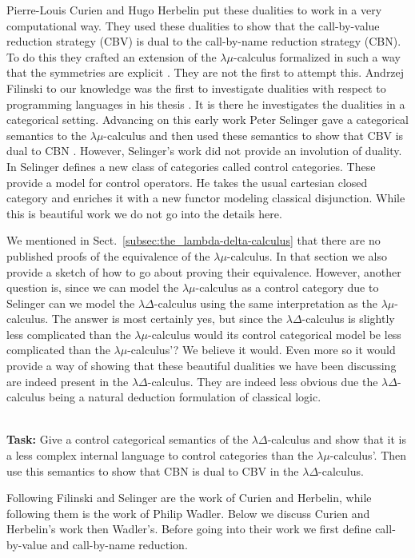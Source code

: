 Pierre-Louis Curien and Hugo Herbelin put these dualities to work in a
very computational way.  They used these dualities to show that the
call-by-value reduction strategy (CBV) is dual to the call-by-name
reduction strategy (CBN).  To do this they crafted an extension of the
$\lambda\mu$-calculus formalized in such a way that the symmetries are
explicit \cite{Curien:2000}.  They are not the first to attempt this.
Andrzej Filinski to our knowledge was the first to investigate
dualities with respect to programming languages in his thesis
\cite{Filinski:1989}.  It is there he investigates the dualities in a
categorical setting.  Advancing on this early work Peter Selinger gave
a categorical semantics to the $\lambda\mu$-calculus and then used
these semantics to show that CBV is dual to CBN \cite{Selinger:2001}.
However, Selinger's work did not provide an involution of duality.  In
\cite{Selinger:2001} Selinger defines a new class of categories called
control categories.  These provide a model for control operators.  He
takes the usual cartesian closed category and enriches it with a new
functor modeling classical disjunction.  While this is beautiful work
we do not go into the details here.  

\begin{openproblem}
  We mentioned in Sect.~\ref{subsec:the_lambda-delta-calculus} that
  there are no published proofs of the equivalence of the
  $\lambda\mu$-calculus.  In that section we also provide a sketch of
  how to go about proving their equivalence.  However, another
  question is, since we can model the $\lambda\mu$-calculus as a
  control category due to Selinger can we model the
  $\lambda\Delta$-calculus using the same interpretation as the
  $\lambda\mu$-calculus.  The answer is most certainly yes, but since
  the $\lambda\Delta$-calculus is slightly less complicated than the
  $\lambda\mu$-calculus would its control categorical model be less
  complicated than the $\lambda\mu$-calculus'?  We believe it would.
  Even more so it would provide a way of showing that these beautiful
  dualities we have been discussing are indeed present in the
  $\lambda\Delta$-calculus.  They are indeed less obvious due the
  $\lambda\Delta$-calculus being a natural deduction formulation of
  classical logic.

  \ \\
  \noindent
  \textbf{Task:} Give a control categorical semantics of the
  $\lambda\Delta$-calculus and show that it is a less complex internal
  language to control categories than the $\lambda\mu$-calculus'.  Then
  use this semantics to show that CBN is dual to CBV in the
  $\lambda\Delta$-calculus.
\end{openproblem}
\noindent
Following Filinski and Selinger are the work of Curien and Herbelin,
while following them is the work of Philip Wadler.  Below we discuss
Curien and Herbelin's work then Wadler's.  Before going into their work
we first define call-by-value and call-by-name reduction.


